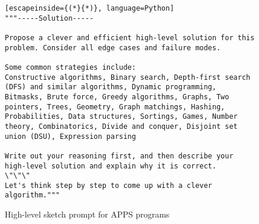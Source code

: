 \begin{figure*}[h] 
\begin{lstlisting}[escapeinside={(*}{*)}, language=Python]
"""-----Solution-----

Propose a clever and efficient high-level solution for this problem. Consider all edge cases and failure modes.

Some common strategies include:
Constructive algorithms, Binary search, Depth-first search (DFS) and similar algorithms, Dynamic programming, Bitmasks, Brute force, Greedy algorithms, Graphs, Two pointers, Trees, Geometry, Graph matchings, Hashing, Probabilities, Data structures, Sortings, Games, Number theory, Combinatorics, Divide and conquer, Disjoint set union (DSU), Expression parsing

Write out your reasoning first, and then describe your high-level solution and explain why it is correct.
\"\"\"
Let's think step by step to come up with a clever algorithm."""
\end{lstlisting} 
\caption{High-level sketch prompt for APPS programs}
\end{figure*}

